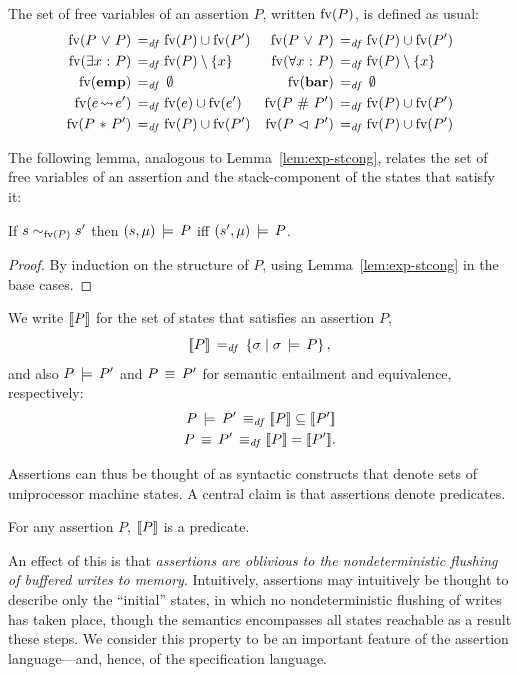 \documentclass[11pt]{report}
\begin{document}
The set of free variables of an assertion $P$, written $\mathrm{fv}(P)$, is defined as usual: \begin{align*}
    \mathrm{fv}(P \operatorname{\,\vee\,} P) \operatorname{\;=_{\mathit{df}}\;} & \mathrm{fv}(P) \cup \mathrm{fv}(P') & \mathrm{fv}(P \operatorname{\,\vee\,} P) \operatorname{\;=_{\mathit{df}}\;} & \mathrm{fv}(P) \cup \mathrm{fv}(P') \\ 
    \mathrm{fv}(\exists x \operatorname{\,:\,} P) \operatorname{\;=_{\mathit{df}}\;} &\mathrm{fv}(P) \setminus \left\lbrace x \right\rbrace & \mathrm{fv}(\forall x \operatorname{\,:\,} P) \operatorname{\;=_{\mathit{df}}\;} &\mathrm{fv}(P) \setminus \left\lbrace x \right\rbrace \\
    \mathrm{fv}(\mathbf{emp}) \operatorname{\;=_{\mathit{df}}\;} & \operatorname{\emptyset} &  \mathrm{fv}(\mathbf{bar}) \operatorname{\;=_{\mathit{df}}\;} & \operatorname{\emptyset} \\
    \mathrm{fv}(e \!\leadsto\! e') \operatorname{\;=_{\mathit{df}}\;} & \mathrm{fv}(e) \cup \mathrm{fv}(e') &
    \mathrm{fv}(P \operatorname{\,\#\,} P') \operatorname{\;=_{\mathit{df}}\;} & \mathrm{fv}(P) \cup \mathrm{fv}(P') \\  
    \mathrm{fv}(P \operatorname{\,\ast\,} P') \operatorname{\;=_{\mathit{df}}\;} & \mathrm{fv}(P) \cup \mathrm{fv}(P') & 
    \mathrm{fv}(P \operatorname{\,\vartriangleleft\,} P') \operatorname{\;=_{\mathit{df}}\;} & \mathrm{fv}(P) \cup \mathrm{fv}(P') \\
\end{align*}

The following lemma, analogous to Lemma~\ref{lem:exp-stcong}, relates the set of free variables of an assertion and the stack-component of the states that satisfy it:
\begin{lemma}
\label{lem:assertion-stcong}
    If $s \sim_{\mathrm{fv}(P)} s'$ then $(s,\mu) \,\models\, P$ iff $(s',\mu) \,\models\, P$. 
\end{lemma}
\begin{proof}
By induction on the structure of $P$, using Lemma~\ref{lem:exp-stcong} in the base cases. 
\end{proof}

We write $[\![P]\!]$ for the set of states that satisfies an assertion $P$,\[ [\![P]\!] \operatorname{\;=_{\mathit{df}}\;} \left\lbrace \sigma \mid \sigma \,\models\, P \right\rbrace,\] and also $P \,\models\, P'$ and $P \,\equiv\, P'$ for semantic entailment and equivalence, respectively: \begin{align*}
    P \sentails P' \iffdef \pred{P} \subseteq \pred{P'} \\
    P \sequiv P' \iffdef \pred{P} = \pred{P'}.
\end{align*} 


Assertions can thus be thought of as syntactic constructs that denote sets of uniprocessor machine states. A central claim is that assertions denote predicates. 

\begin{lemma}
    \label{lem:assertions-denote-predicates}
    For any assertion $P$, $[\![P]\!]$ is a predicate. 
\end{lemma}

An effect of this is that \emph{assertions are oblivious to the nondeterministic flushing of buffered writes to memory}. Intuitively, assertions may intuitively be thought to describe only the ``initial'' states, in which no nondeterministic flushing of writes has taken place, though the semantics encompasses all states reachable as a result these steps. We consider this property to be an important feature of the assertion language---and, hence, of the specification language. 
\end{document}
